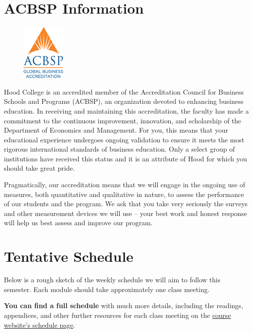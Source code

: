 \documentclass{article}
\begin{document}
\hypertarget{acbsp-information}{%
\section*{ACBSP Information}\label{acbsp-information}}

\begin{figure}[h!]
\centering
\includegraphics[]{../images/acbsp.png}
\end{figure}

Hood College is an accredited member of the Accreditation Council for
Business Schools and Programs (ACBSP), an organization devoted to
enhancing business education. In receiving and maintaining this
accreditation, the faculty has made a commitment to the continuous
improvement, innovation, and scholarship of the Department of Economics
and Management. For you, this means that your educational experience
undergoes ongoing validation to ensure it meets the most rigorous
international standards of business education. Only a select group of
institutions have received this status and it is an attribute of Hood
for which you should take great pride.

Pragmatically, our accreditation means that we will engage in the
ongoing use of measures, both quantitative and qualitative in nature, to
assess the performance of our students and the program. We ask that you
take very seriously the surveys and other measurement devices we will
use -- your best work and honest response will help us best assess and
improve our program.

\hypertarget{tentative-schedule}{%
\section*{Tentative Schedule}\label{tentative-schedule}}

Below is a rough sketch of the weekly schedule we will aim to follow
this semester. Each module should take approximately one class meeting.

\textbf{You can find a full schedule} with much more details, including
the readings, appendices, and other further resources for each class
meeting on the
\href{http://microF20.classes.ryansafner.com/schedule/}{course website's
schedule page}.
\end{document}
